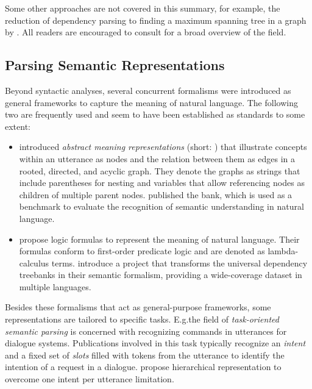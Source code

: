 \documentclass[../document.tex]{subfiles}
\begin{document}
    Some other approaches are not covered in this summary, for example, the reduction of dependency parsing to finding a maximum spanning tree in a graph by \citet{mcdonald-etal-2005-non}.
    All readers are encouraged to consult \citet{nivre2010dependency} for a broad overview of the field.

    \subsection{Parsing Semantic Representations}
    Beyond syntactic analyses, several concurrent formalisms were introduced as general frameworks to capture the meaning of natural language.
    The following two are frequently used and seem to have been established as standards to some extent:
    \begin{itemize}
        \item \citet{langkilde-knight-1998-generation} introduced \emph{abstract meaning representations} (short: ) that illustrate concepts within an utterance as nodes and the relation between them as edges in a rooted, directed, and acyclic graph. They denote the graphs as strings that include parentheses for nesting and variables that allow referencing nodes as children of multiple parent nodes. \citet{knight2021abstract} published the  bank, which is used as a benchmark to evaluate the recognition of semantic understanding in natural language.
        \item \citet{reddy-etal-2016-transforming} propose logic formulas to represent the meaning of natural language. Their formulas conform to first-order predicate logic and are denoted as lambda-calculus terms. \citet{reddy-etal-2017-universal} introduce a project that transforms the universal dependency treebanks in their semantic formalism, providing a wide-coverage dataset in multiple languages.
    \end{itemize}
    Besides these formalisms that act as general-purpose frameworks, some representations are tailored to specific tasks.
    E.g.\@ the field of \emph{task-oriented semantic parsing} is concerned with recognizing commands in utterances for dialogue systems.
    Publications involved in this task typically recognize an \emph{intent} and a fixed set of \emph{slots} filled with tokens from the utterance to identify the intention of a request in a dialogue.
     propose hierarchical representation to overcome one intent per utterance limitation.
\end{document}
